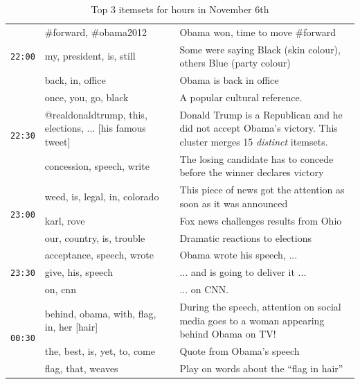 \documentclass[letterpaper,12pt,titlepage,oneside,final]{book}
\begin{document}
\begin{table}
\begin{center}
\begin{tabular}{|p{.6cm}|p{2.5cm}|p{5cm}|}
\multirow{3}{*}{\texttt{22:00}} 	& \#forward, \#obama2012		&  Obama won, time to move \#forward \\ \cline{2-3}
					   	& my, president, is, still		& Some were saying Black (skin colour), others Blue (party colour) \\ \cline{2-3}
						& back, in, office		&   Obama is back in office\\\hline

\multirow{3}{*}{\texttt{22:30}} 	& once, you, go, black		& A popular cultural reference.\\ \cline{2-3} %
					   	& @realdonaldtrump, this, elections, ... [his famous tweet] 		& Donald Trump is a Republican and he did not accept Obama's victory. This cluster merges 15 \emph{distinct} itemsets.\\ \cline{2-3}
						& concession, speech, write		&   The losing candidate has to concede before the winner declares victory \\\hline
						
\multirow{3}{*}{\texttt{23:00}} 	& weed, is, legal, in, colorado		&  This piece of news got the attention as soon as it was announced  \\ \cline{2-3}
					   	& karl, rove		& Fox news challenges results from Ohio\\ \cline{2-3}
						& our, country, is, trouble		&   Dramatic reactions to elections \\\hline						
\multirow{3}{*}{\texttt{23:30}} 	& acceptance, speech, wrote		&  Obama wrote his speech, ...\\ \cline{2-3}
					   	& give, his, speech		& ... and is going to deliver it ... \\ \cline{2-3}
						& on, cnn		&   ... on CNN. \\\hline	
						
\multirow{3}{*}{\texttt{00:30}} 	& behind, obama, with, flag, in, her [hair]		&  During the speech, attention on social media goes to a woman appearing behind Obama on TV! \\ \cline{2-3}
					   	& the, best, is, yet, to, come		&  Quote from Obama's speech\\ \cline{2-3}
						& flag, that, weaves	& Play on words about the ``flag in hair'' \\\hline																			
\end{tabular}
\end{center}
\caption{Top 3 itemsets for hours in November 6th}
 \label{table:nov6}
\end{table}
\end{document}
